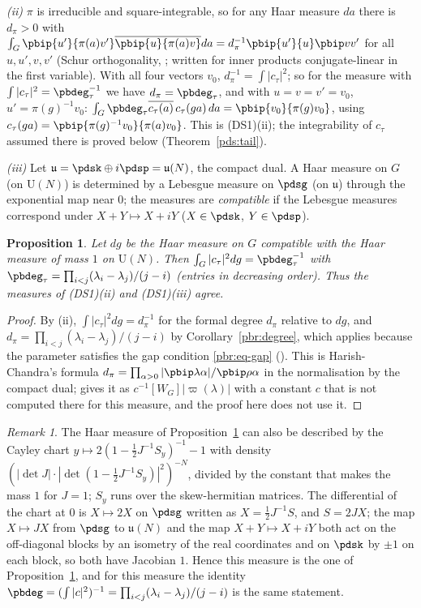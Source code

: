 \documentclass[10pt]{amsart}
\newtheorem{proposition}[theorem]{Proposition}
\theoremstyle{definition}
\theoremstyle{remark}
\newtheorem{remark}[theorem]{Remark}
\providecommand{\auU}{\mathrm U}
\providecommand{\aubar}[1]{\overline{#1}}
\begin{document}
\emph{(ii)} $\pi$ is irreducible and square-integrable, so for any Haar measure $da$ there is
$d_\pi>0$ with $\int_G\pbip{u'}{\pi(a)v'}\allowbreak \aubar{\pbip{u}{\pi(a)v}}da=d_\pi^{-1}\pbip{u'}{u}
\pbip v{v'}$ for all $u,u',v,v'$ (Schur orthogonality, \cite[Proposition~9.6, p.~284]{Knapp}; written for inner products conjugate-linear in the first variable). With all four
vectors $v_0$, $d_\pi^{-1}=\int|c_\tau|^2$; so for the measure with $\int|c_\tau|^2=\pbdeg_\tau^{-1}$
we have $d_\pi=\pbdeg_\tau$, and with $u=v=v'=v_0$, $u'=\pi(g)^{-1}v_0$:
$\int_G\pbdeg_\tau\aubar{c_\tau(a)}\,c_\tau(ga)\,da=\pbip{v_0}{\pi(g)v_0}$, using $c_\tau(ga)=
\pbip{\pi(g)^{-1}v_0}{\pi(a)v_0}$. This is \textup{(DS1)(ii)}; the integrability of $c_\tau$ assumed
there is proved below (Theorem~\ref{pds:tail}).

\emph{(iii)} Let $\mathfrak u=\pdsk\oplus i\pdsp=\mathfrak u(N)$, the compact dual. A Haar measure on
$G$ (on $\auU(N)$) is determined by a Lebesgue measure on $\pdsg$ (on $\mathfrak u$) through the
exponential map near $0$; the measures are \emph{compatible} if the Lebesgue measures correspond
under $X+Y\mapsto X+iY$ ($X\in\pdsk$, $Y\in\pdsp$).

\begin{proposition}\label{pds:haar}
Let $dg$ be the Haar measure on $G$ compatible with the Haar measure of mass $1$ on $\auU(N)$. Then
$\int_G|c_\tau|^2dg=\pbdeg_\tau^{-1}$ with $\pbdeg_\tau=\prod_{i<j}(\lambda_i-\lambda_j)/(j-i)$
(entries in decreasing order). Thus the measures of \textup{(DS1)(ii)} and \textup{(DS1)(iii)} agree.
\end{proposition}
\begin{proof}
By (ii), $\int|c_\tau|^2dg=d_\pi^{-1}$ for the formal degree $d_\pi$ relative to $dg$, and
$d_\pi=\prod_{i<j}(\lambda_i-\lambda_j)/(j-i)$ by Corollary~\ref{pbr:degree}, which applies because
the parameter satisfies the gap condition \eqref{pbr:eq-gap} ({\cite[Proposition~2.19]{P49}}). This is
Harish-Chandra's formula $d_\pi=\prod_{\alpha>0}|\pbip\lambda\alpha|/\pbip\rho\alpha$ in the
normalisation by the compact dual; \cite[Theorem~16, p.~96]{HC66} gives it as $c^{-1}[W_G]|\varpi(\lambda)|$ with a constant $c$ that is not
computed there for this measure, and the proof here does not use it.
\end{proof}

\begin{remark}\label{pds:cayley}
The Haar measure of Proposition~\ref{pds:haar} can also be described by the Cayley chart
$y\mapsto2(1-\frac12J^{-1}S_y)^{-1}-1$ with density $(|\det J|\cdot|\det(1-\frac12J^{-1}S_y)|^2)^{-N}$,
divided by the constant that makes the mass $1$ for $J=1$; $S_y$ runs over the skew-hermitian matrices. The differential of the chart at $0$ is $X\mapsto2X$ on $\pdsg$ written as
$X=\frac12J^{-1}S$, and $S=2JX$; the map $X\mapsto JX$ from $\pdsg$ to $\mathfrak u(N)$ and the map
$X+Y\mapsto X+iY$ both act on the off-diagonal blocks by an isometry of the real coordinates and on
$\pdsk$ by $\pm1$ on each block, so both have Jacobian $1$. Hence this measure is the one of
Proposition~\ref{pds:haar}, and for this measure the identity $\pbdeg=(\int|c|^2)^{-1}=\prod_{i<j}
(\lambda_i-\lambda_j)/(j-i)$ is the same statement.
\end{remark}
\end{document}
